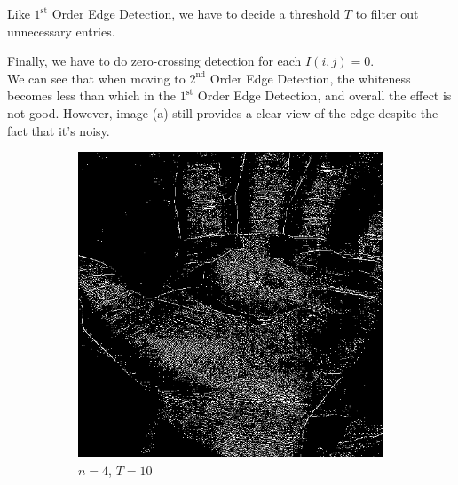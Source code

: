 \documentclass{article}
\begin{document}
\begin{enumerate}[label=(\alph*)]
    Like $1^\text{st}$ Order Edge Detection, we have to decide a threshold $T$ to filter out unnecessary entries.

    Finally, we have to do zero-crossing detection for each $I(i, j) = 0$. \\

    We can see that when moving to $2^\text{nd}$ Order Edge Detection, the whiteness becomes less than which in the $1^\text{st}$ Order Edge Detection, and overall the effect is not good. However, image (a) still provides a clear view of the edge despite the fact that it's noisy.

    \begin{figure}[!htb]
        \centering
        \begin{subfigure}[b]{0.3\textwidth}
            \includegraphics[width=\textwidth]{img/ED2_4_10.png}
            \caption{$n = 4$, $T = 10$}
        \end{subfigure}
        ~
        \begin{subfigure}[b]{0.3\textwidth}

\end{subfigure}
\end{figure}
\end{enumerate}
\end{document}
